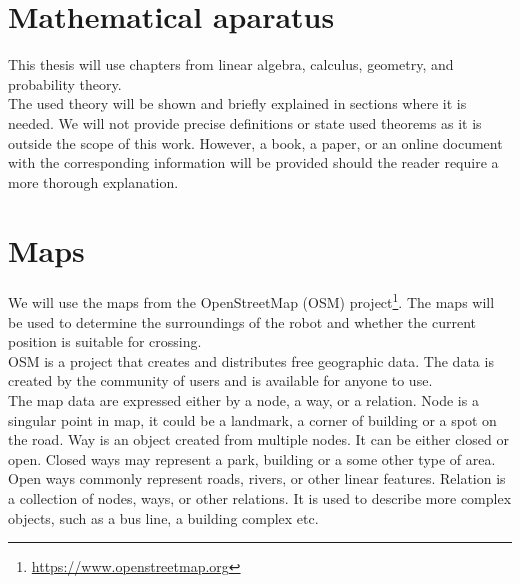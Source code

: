 \section{Mathematical aparatus}
    This thesis will use chapters from linear algebra, calculus, geometry, and probability theory.\\
    The used theory will be shown and briefly explained in sections where it is needed. We will not provide precise definitions or state used theorems as it is outside the scope of this work. However, a book, a paper, or an online document with the corresponding information will be provided should the reader require a more thorough explanation.\\

\section{Maps}
    We will use the maps from the OpenStreetMap (OSM) project\footnote{\url{https://www.openstreetmap.org}}. The maps will be used to determine the surroundings of the robot and whether the current position is suitable for crossing.\\
    OSM is a project that creates and distributes free geographic data. The data is created by the community of users and is available for anyone to use.\cite{OSMwiki}\\
    The map data are expressed either by a node, a way, or a relation. Node is a singular point in map, it could be a landmark, a corner of building or a spot on the road. Way is an object created from multiple nodes. It can be either closed or open. Closed ways may represent a park, building or a some other type of area. Open ways commonly represent roads, rivers, or other linear features. Relation is a collection of nodes, ways, or other relations. It is used to describe more complex objects, such as a bus line, a building complex etc.